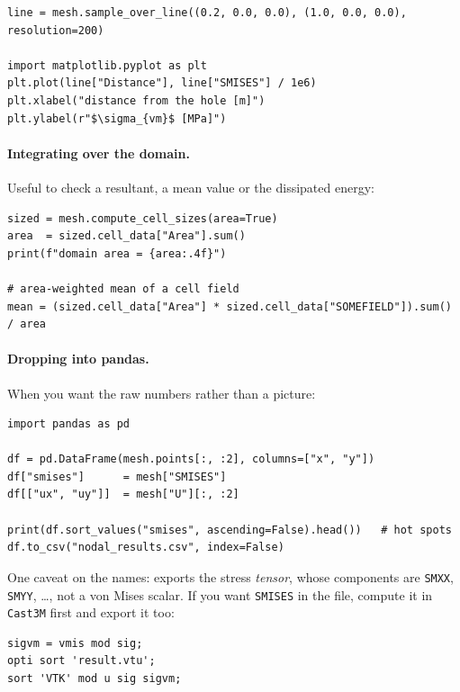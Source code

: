 \begin{codebox}
\begin{verbatim}
line = mesh.sample_over_line((0.2, 0.0, 0.0), (1.0, 0.0, 0.0), resolution=200)

import matplotlib.pyplot as plt
plt.plot(line["Distance"], line["SMISES"] / 1e6)
plt.xlabel("distance from the hole [m]")
plt.ylabel(r"$\sigma_{vm}$ [MPa]")
\end{verbatim}
\end{codebox}

\paragraph{Integrating over the domain.} Useful to check a resultant, a mean
value or the dissipated energy:

\begin{codebox}
\begin{verbatim}
sized = mesh.compute_cell_sizes(area=True)
area  = sized.cell_data["Area"].sum()
print(f"domain area = {area:.4f}")

# area-weighted mean of a cell field
mean = (sized.cell_data["Area"] * sized.cell_data["SOMEFIELD"]).sum() / area
\end{verbatim}
\end{codebox}

\paragraph{Dropping into pandas.} When you want the raw numbers rather than a
picture:

\begin{codebox}
\begin{verbatim}
import pandas as pd

df = pd.DataFrame(mesh.points[:, :2], columns=["x", "y"])
df["smises"]      = mesh["SMISES"]
df[["ux", "uy"]]  = mesh["U"][:, :2]

print(df.sort_values("smises", ascending=False).head())   # hot spots
df.to_csv("nodal_results.csv", index=False)
\end{verbatim}
\end{codebox}

\noindent One caveat on the names:  exports the
stress \emph{tensor}, whose components are \texttt{SMXX}, \texttt{SMYY},
\ldots, not a von Mises scalar. If you want \texttt{SMISES} in the file,
compute it in \texttt{Cast3M} first and export it too:

\begin{codebox}
\begin{verbatim}
sigvm = vmis mod sig;
opti sort 'result.vtu';
sort 'VTK' mod u sig sigvm;
\end{verbatim}
\end{codebox}

